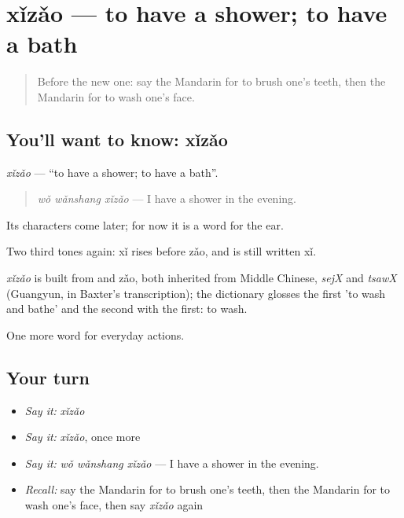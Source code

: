 \section[xǐzǎo]{xǐzǎo — to have a shower; to have a bath}

\label{lesson:ZH-C99-xizao}



\begin{quote}
Before the new one: say the Mandarin for to brush one's teeth, then the Mandarin for to wash one's face.
\end{quote}

\subsection*{You'll want to know: xǐzǎo}
\emph{xǐzǎo} — \textquotedblleft{}to have a shower; to have a bath\textquotedblright{}.

\begin{quote}
\emph{wǒ wǎnshang xǐzǎo} — I have a shower in the evening.
\end{quote}

Its characters come later; for now it is a word for the ear.

Two third tones again: xǐ rises before zǎo, and is still written xǐ.

\begin{cousinweb}
\emph{xǐzǎo} is built from  and zǎo, both inherited from Middle Chinese, \emph{sejX} and \emph{tsawX} (Guangyun, in Baxter's transcription); the dictionary glosses the first 'to wash and bathe' and the second with the first: to wash.
\end{cousinweb}

\begin{grammarlens}[title={What you've built}]
One more word for everyday actions.
\end{grammarlens}

\subsection*{Your turn}
\begin{itemize}
\raggedright
  \item \emph{Say it:} \emph{xǐzǎo}
  \item \emph{Say it:} \emph{xǐzǎo}, once more
  \item \emph{Say it:} \emph{wǒ wǎnshang xǐzǎo} — I have a shower in the evening.
  \item \emph{Recall:} say the Mandarin for to brush one's teeth, then the Mandarin for to wash one's face, then say \emph{xǐzǎo} again
\end{itemize}

